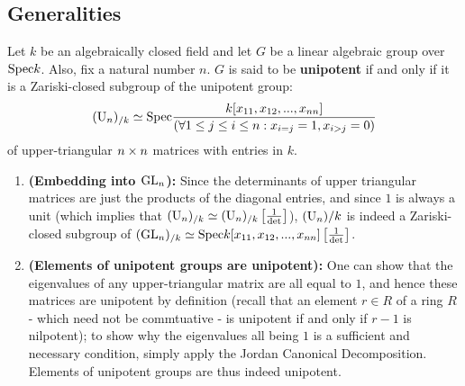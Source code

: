         \subsection{Generalities}
            \begin{definition} \label{def: unipotent_groups}
                Let $k$ be an algebraically closed field and let $G$ be a linear algebraic group over $\mathrm{Spec} k$. Also, fix a natural number $n$. $G$ is said to be \textbf{unipotent} if and only if it is a Zariski-closed subgroup of the unipotent group:
                    $$(\operatorname{U}_n)_{/k} \simeq \mathrm{Spec} \frac{k[x_{11}, x_{12}, ..., x_{nn}]}{(\forall 1 \leq j \leq i \leq n: x_{i = j} = 1, x_{i > j} = 0)}$$
                of upper-triangular $n \x n$ matrices with entries in $k$.
            \end{definition}
            \begin{remark} \label{remark: unipotent_groups_are_linear_algebraic_groups}
                \noindent
                \begin{enumerate}
                    \item \textbf{(Embedding into $\operatorname{GL}_n$):} Since the determinants of upper triangular matrices are just the products of the diagonal entries, and since $1$ is always a unit (which implies that $(\operatorname{U}_n)_{/k} \simeq (\operatorname{U}_n)_{/k}\left[\frac{1}{\det}\right]$), $(\operatorname{U}_n){/k}$ is indeed a Zariski-closed subgroup of $(\operatorname{GL}_n)_{/k} \simeq \mathrm{Spec} k[x_{11}, x_{12}, ..., x_{nn}]\left[\frac{1}{\det}\right]$. 
                    \item \textbf{(Elements of unipotent groups are unipotent):} One can show that the eigenvalues of any upper-triangular matrix are all equal to $1$, and hence these matrices are unipotent by definition (recall that an element $r \in R$ of a ring $R$ - which need not be commtuative - is unipotent if and only if $r - 1$ is nilpotent); to show why the eigenvalues all being $1$ is a sufficient and necessary condition, simply apply the Jordan Canonical Decomposition. Elements of unipotent groups are thus indeed unipotent.
                \end{enumerate}
            \end{remark}
